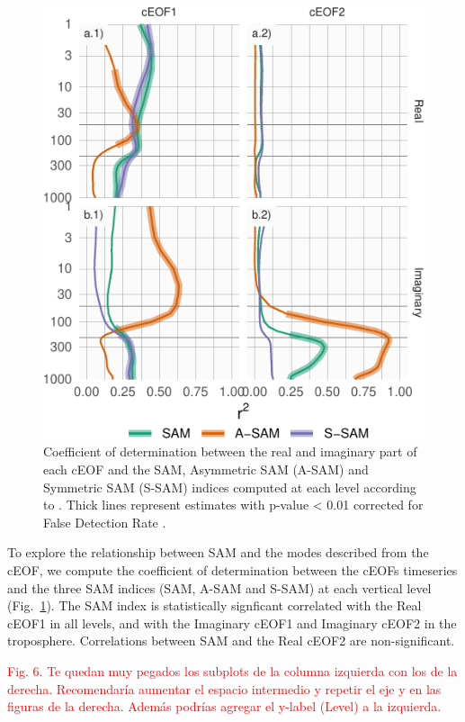 \documentclass[smallextended]{svjour3}       %
\begin{document}
\begin{figure}
\centering
\includegraphics{../figures/sam-eof-vertical-1.pdf}
\caption{\label{fig:sam-eof-vertical}Coefficient of determination between the real and imaginary part of each cEOF and the SAM, Asymmetric SAM (A-SAM) and Symmetric SAM (S-SAM) indices computed at each level according to \citet{campitelli2021}. Thick lines represent estimates with p-value \textless{} 0.01 corrected for False Detection Rate \citep{benjamini1995}.}
\end{figure}

To explore the relationship between SAM and the modes described from the cEOF, we compute the coefficient of determination between the cEOFs timeseries and the three SAM indices (SAM, A-SAM and S-SAM) at each vertical level (Fig.~\ref{fig:sam-eof-vertical}).
The SAM index is statistically signficant correlated with the Real cEOF1 in all levels, and with the Imaginary cEOF1 and Imaginary cEOF2 in the troposphere.
Correlations between SAM and the Real cEOF2 are non-significant.

\textcolor{red}{Fig. 6. Te quedan muy pegados los subplots de la columna izquierda con los de la derecha. Recomendaría aumentar el espacio intermedio y repetir el eje y en las figuras de la derecha. Además podrías agregar el y-label (Level) a la izquierda.}
\end{document}
